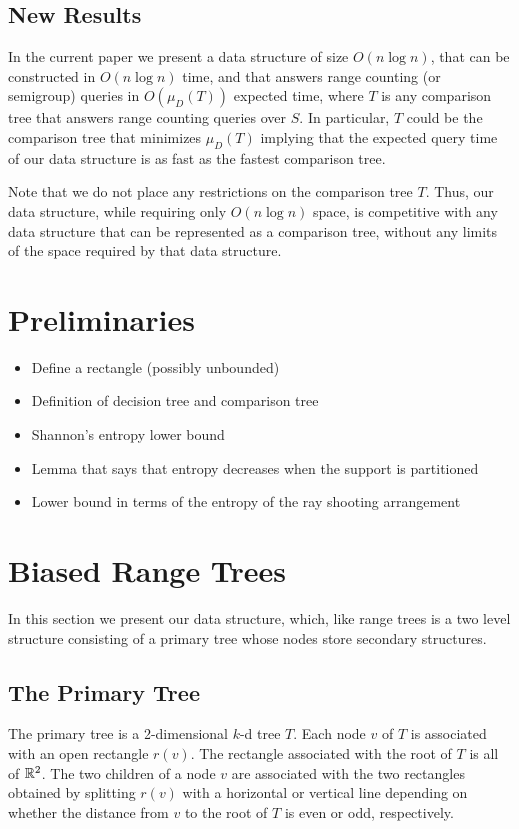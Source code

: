 \documentclass[lotsofwhite,charterfonts]{patmorin}
\begin{document}
\subsection{New Results}

In the current paper we present a data structure of size $O(n\log n)$,
that can be constructed in $O(n\log n)$ time, and that answers range
counting (or semigroup) queries in $O(\mu_D(T))$ expected time, where
$T$ is any comparison tree that answers range counting queries over $S$.
In particular, $T$ could be the comparison tree that minimizes
$\mu_D(T)$ implying that the expected query time of our data structure
is as fast as the fastest comparison tree.

Note that we do not place any restrictions on the comparison tree $T$.
Thus, our data structure, while requiring only $O(n\log n)$ space, is
competitive with any data structure that can be represented as a
comparison tree, without any limits of the space required by that data
structure.

\section{Preliminaries}

\begin{itemize}
\item Define a rectangle (possibly unbounded)
\item Definition of decision tree and comparison tree
\item Shannon's entropy lower bound
\item Lemma that says that entropy decreases when the support is
partitioned
\item Lower bound in terms of the entropy of the ray shooting
arrangement
\end{itemize}

\section{Biased Range Trees}

In this section we present our data structure, which, like range trees
is a two level structure consisting of a primary tree whose nodes
store secondary structures.

\subsection{The Primary Tree}

The primary tree is a 2-dimensional $k$-d tree \cite{X} $T$.  Each
node $v$ of $T$ is associated with an open rectangle $r(v)$.  The
rectangle associated with the root of $T$ is all of $\mathbb{R}^2$. The two
children of a node $v$ are associated with the two rectangles obtained
by splitting $r(v)$ with a horizontal or vertical line depending on
whether the distance from $v$ to the root of $T$ is even or odd,
respectively. 
\end{document}

